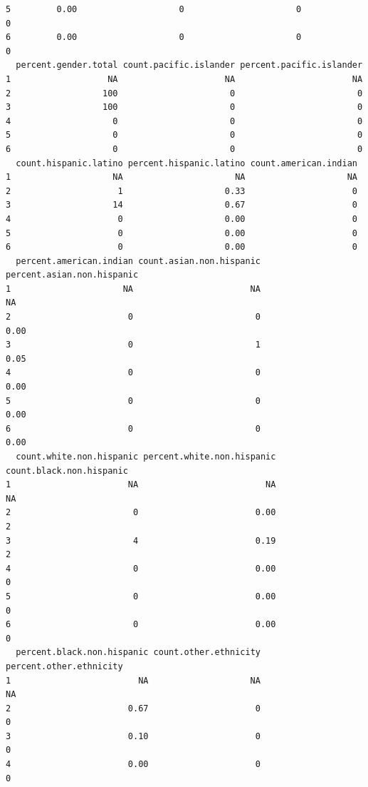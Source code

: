 \documentclass[
  letterpaper,
  DIV=11,
  numbers=noendperiod]{scrartcl}
\begin{document}
\begin{verbatim}
5         0.00                    0                      0                  0
6         0.00                    0                      0                  0
  percent.gender.total count.pacific.islander percent.pacific.islander
1                   NA                     NA                       NA
2                  100                      0                        0
3                  100                      0                        0
4                    0                      0                        0
5                    0                      0                        0
6                    0                      0                        0
  count.hispanic.latino percent.hispanic.latino count.american.indian
1                    NA                      NA                    NA
2                     1                    0.33                     0
3                    14                    0.67                     0
4                     0                    0.00                     0
5                     0                    0.00                     0
6                     0                    0.00                     0
  percent.american.indian count.asian.non.hispanic percent.asian.non.hispanic
1                      NA                       NA                         NA
2                       0                        0                       0.00
3                       0                        1                       0.05
4                       0                        0                       0.00
5                       0                        0                       0.00
6                       0                        0                       0.00
  count.white.non.hispanic percent.white.non.hispanic count.black.non.hispanic
1                       NA                         NA                       NA
2                        0                       0.00                        2
3                        4                       0.19                        2
4                        0                       0.00                        0
5                        0                       0.00                        0
6                        0                       0.00                        0
  percent.black.non.hispanic count.other.ethnicity percent.other.ethnicity
1                         NA                    NA                      NA
2                       0.67                     0                       0
3                       0.10                     0                       0
4                       0.00                     0                       0

\end{verbatim}
\end{document}
